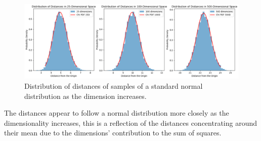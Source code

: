 \documentclass[12pt]{report}
\begin{document}
\begin{figure}[h]
    \centering
    \includegraphics[width=\textwidth]{chap8.png}
    \caption{Distribution of distances of samples of a standard normal distribution as the dimension increases.}
    \label{fig:8_13c}
\end{figure}

The distances appear to follow a normal distribution more closely as the dimensionality increases, this is a reflection of the distances concentrating around their mean due to the dimensions' contribution to the sum of squares.
\end{document}
